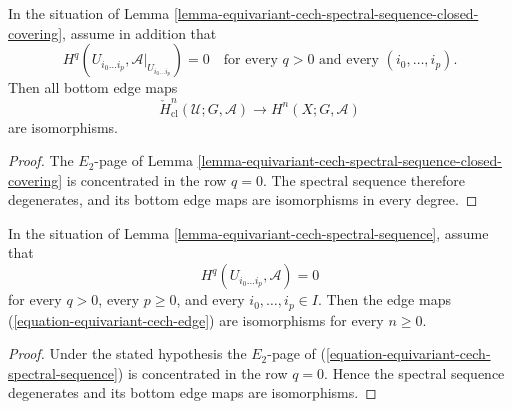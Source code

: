 \begin{lemma}
\label{lemma-equivariant-cech-spectral-sequence-closed-acyclic-cover}
\begin{reference}
\cite[Chapter V, \S 5.5, Corollaries 1 and 2 to Theorem 5.5.3,
pp. 208--209]{Tohoku}
\end{reference}
In the situation of Lemma
\ref{lemma-equivariant-cech-spectral-sequence-closed-covering}, assume in
addition that
$$
H^q(U_{i_0\ldots i_p},\mathcal A|_{U_{i_0\ldots i_p}})=0
\quad\text{for every }q>0\text{ and every }(i_0,\ldots,i_p).
$$
Then all bottom edge maps
$$
\check H^n_{\mathrm{cl}}(\mathcal U;G,\mathcal A)
\longrightarrow H^n(X;G,\mathcal A)
$$
are isomorphisms.
\end{lemma}

\begin{proof}
The $E_2$-page of Lemma
\ref{lemma-equivariant-cech-spectral-sequence-closed-covering} is
concentrated in the row $q=0$.  The spectral sequence therefore degenerates,
and its bottom edge maps are isomorphisms in every degree.
\end{proof}

\begin{lemma}
\label{lemma-equivariant-cech-spectral-sequence-acyclic-cover}
\begin{reference}
\cite[Chapter V, \S 5.5, Corollary 1 to Theorem 5.5.3, p. 209]{Tohoku}
\end{reference}
In the situation of Lemma
\ref{lemma-equivariant-cech-spectral-sequence}, assume that
$$
H^q(U_{i_0\ldots i_p},\mathcal{A})=0
$$
for every $q>0$, every $p\geq 0$, and every
$i_0,\ldots,i_p\in I$. Then the edge maps
(\ref{equation-equivariant-cech-edge}) are isomorphisms for every
$n\geq 0$.
\end{lemma}

\begin{proof}
Under the stated hypothesis the $E_2$-page of
(\ref{equation-equivariant-cech-spectral-sequence}) is concentrated in
the row $q=0$. Hence the spectral sequence degenerates and its bottom
edge maps are isomorphisms.
\end{proof}


